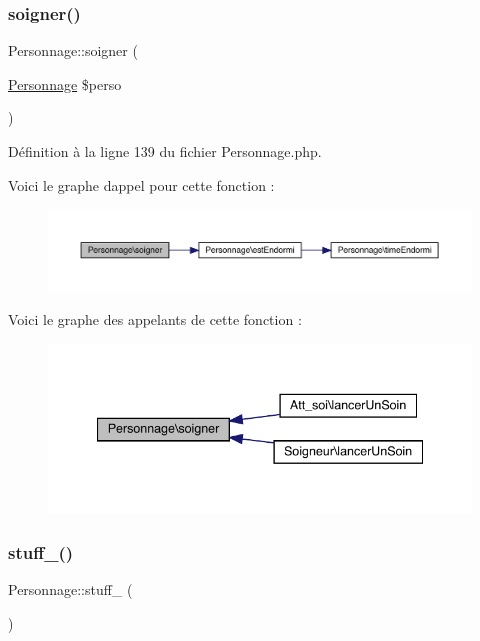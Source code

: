 \subsubsection{\texorpdfstring{soigner()}{soigner()}}
{\footnotesize\ttfamily Personnage\+::soigner (\begin{DoxyParamCaption}\item[{\mbox{\hyperlink{class_personnage}{Personnage}}}]{\$perso }\end{DoxyParamCaption})}



Définition à la ligne 139 du fichier Personnage.\+php.

Voici le graphe d\textquotesingle{}appel pour cette fonction \+:\nopagebreak
\begin{figure}[H]
\begin{center}
\leavevmode
\includegraphics[width=350pt]{class_personnage_a1219171b9ddba0fecfa49995d7d71372_cgraph}
\end{center}
\end{figure}
Voici le graphe des appelants de cette fonction \+:\nopagebreak
\begin{figure}[H]
\begin{center}
\leavevmode
\includegraphics[width=340pt]{class_personnage_a1219171b9ddba0fecfa49995d7d71372_icgraph}
\end{center}
\end{figure}
\mbox{\label{class_personnage_ac2301a97182f37929b2815d6718730ed}} 
\subsubsection{\texorpdfstring{stuff\+\_()}{stuff\_1()}}
{\footnotesize\ttfamily Personnage\+::stuff\+\_ (\begin{DoxyParamCaption}{ }\end{DoxyParamCaption})}



